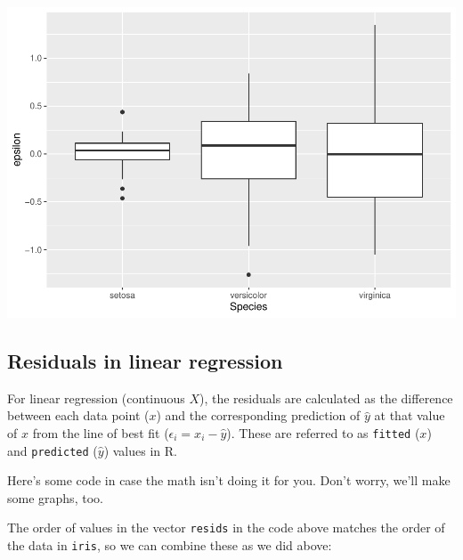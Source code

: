 \documentclass[
]{book}
\newenvironment{Shaded}{\begin{snugshade}}{\end{snugshade}}
\newcommand{\CommentTok}[1]{\textcolor[rgb]{0.56,0.35,0.01}{\textit{#1}}}
\newcommand{\DataTypeTok}[1]{\textcolor[rgb]{0.13,0.29,0.53}{#1}}
\newcommand{\KeywordTok}[1]{\textcolor[rgb]{0.13,0.29,0.53}{\textbf{#1}}}
\newcommand{\NormalTok}[1]{#1}
\newcommand{\OperatorTok}[1]{\textcolor[rgb]{0.81,0.36,0.00}{\textbf{#1}}}
\newcommand{\StringTok}[1]{\textcolor[rgb]{0.31,0.60,0.02}{#1}}
\begin{document}
\includegraphics{worstr_files/figure-latex/unnamed-chunk-219-1.pdf}

\hypertarget{residuals-in-linear-regression}{%
\subsection{Residuals in linear regression}\label{residuals-in-linear-regression}}

For linear regression (continuous \(X\)), the residuals are calculated as the difference between each data point (\(x\)) and the corresponding prediction of \(\hat{y}\) at that value of \(x\) from the line of best fit (\(\epsilon_i = x_i - \hat{y}\)). These are referred to as \texttt{fitted} (\(x\)) and \texttt{predicted} (\(\hat{y}\)) values in R.

Here's some code in case the math isn't doing it for you. Don't worry, we'll make some graphs, too.

\begin{Shaded}
\end{Shaded}

The order of values in the vector \texttt{resids} in the code above matches the order of the data in \texttt{iris}, so we can combine these as we did above:
\end{document}
